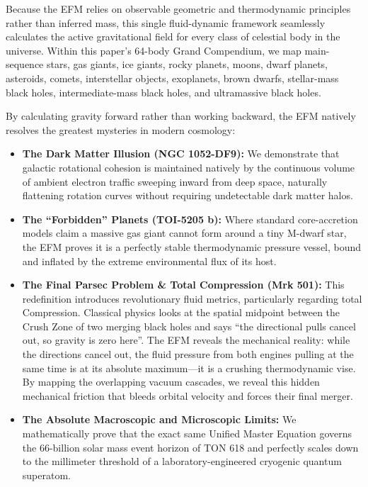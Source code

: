 \documentclass[11pt, a4paper]{article}
\begin{document}
  Because the EFM relies on observable geometric and thermodynamic principles rather than inferred mass, this single fluid-dynamic framework seamlessly calculates the active gravitational field for every class of celestial body in the universe. Within this paper's 64-body Grand Compendium, we map main-sequence stars, gas giants, ice giants, rocky planets, moons, dwarf planets, asteroids, comets, interstellar objects, exoplanets, brown dwarfs, stellar-mass black holes, intermediate-mass black holes, and ultramassive black holes.

  By calculating gravity forward rather than working backward, the EFM natively resolves the greatest mysteries in modern cosmology:
  \begin{itemize}
    \item \textbf{The Dark Matter Illusion (NGC 1052-DF9):} We demonstrate that galactic rotational cohesion is maintained natively by the continuous volume of ambient electron traffic sweeping inward from deep space, naturally flattening rotation curves without requiring undetectable dark matter halos.
    \item \textbf{The ``Forbidden'' Planets (TOI-5205 b):} Where standard core-accretion models claim a massive gas giant cannot form around a tiny M-dwarf star, the EFM proves it is a perfectly stable thermodynamic pressure vessel, bound and inflated by the extreme environmental flux of its host.
    \item \textbf{The Final Parsec Problem \& Total Compression (Mrk 501):} This redefinition introduces revolutionary fluid metrics, particularly regarding total Compression. Classical physics looks at the spatial midpoint between the Crush Zone of two merging black holes and says ``the directional pulls cancel out, so gravity is zero here''. The EFM reveals the mechanical reality: while the directions cancel out, the fluid pressure from both engines pulling at the same time is at its absolute maximum---it is a crushing thermodynamic vise. By mapping the overlapping vacuum cascades, we reveal this hidden mechanical friction that bleeds orbital velocity and forces their final merger.
    \item \textbf{The Absolute Macroscopic and Microscopic Limits:} We mathematically prove that the exact same Unified Master Equation governs the 66-billion solar mass event horizon of TON 618 and perfectly scales down to the millimeter threshold of a laboratory-engineered cryogenic quantum superatom.
  \end{itemize}
\end{document}
